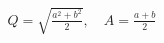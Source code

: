 \documentclass[preview]{standalone}
\begin{document}
\begin{align*}
Q=\sqrt{\tfrac{a^2+b^2}{2}},\quad A=\tfrac{a+b}{2}
\end{align*}
\end{document}
